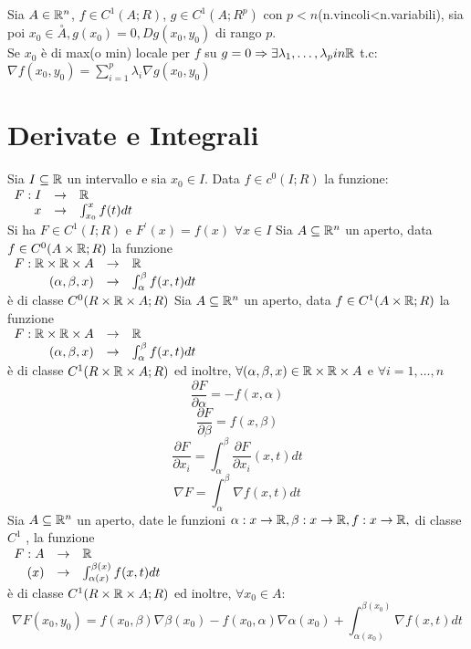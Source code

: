 Sia $A\in \mathbb{R}^n$, $f\in C^1(A;R)$, $g\in C^1(A;R^p)$ con $p<n$(n.vincoli<n.variabili), sia poi $x_0\in\overset{\circ}{A}, g(x_0)=0, Dg (x_0,y_0)$ di rango $p$.\\
Se $x_0$ è di max(o min) locale per $f$ su $g=0\Rightarrow\exists \lambda_1,\ldots,\lambda_p in \mathbb{R}$ t.c: $\nabla f(x_0,y_0) = \sum\limits_{i=1}^{p}\lambda_i\nabla g(x_0,y_0)$\\
\section{Derivate e Integrali}
Sia $I\subseteq \mathbb{R}$ un intervallo e sia $x_0\in I$. Data $f\in c^0(I;R)$ la funzione:\\
$\begin{array}{rcl} F: I & \to & \mathbb{R} \\ x & \to & \int_{x_0}^{x}f(t)dt \end{array}$\\
Si ha $F\in C^1(I;R)$ e $F^{'}(x)=f(x)$ $\forall x \in I$
\proposition
Sia $A\subseteq \mathbb{R}^n$ un aperto, data $f\in C^0(A\times \mathbb{R};R)$ la funzione \\
$\begin{array}{rcl} F: \mathbb{R}\times \mathbb{R}\times A & \to & \mathbb{R} \\ (\alpha,\beta,x) & \to & \int_{\alpha}^{\beta}f(x,t)dt \end{array}$\\
è di classe $C^0(R\times \mathbb{R}\times A;R)$
\proposition
Sia $A\subseteq \mathbb{R}^n$ un aperto, data $f\in C^1(A\times \mathbb{R};R)$ la funzione \\
$\begin{array}{rcl} F: \mathbb{R}\times \mathbb{R}\times A & \to & \mathbb{R} \\ (\alpha,\beta,x) & \to & \int_{\alpha}^{\beta}f(x,t)dt \end{array}$\\
è di classe $C^1(R\times \mathbb{R}\times A;R)$ ed inoltre, $\forall (\alpha,\beta,x)\in \mathbb{R}\times \mathbb{R}\times A$ e $\forall i=1,\ldots,n$\\
$$\frac{\partial F}{\partial \alpha}=-f(x,\alpha)$$
$$\frac{\partial F}{\partial \beta}=f(x,\beta)$$
$$\frac{\partial F}{\partial x_i}=\int_{\alpha}^{\beta}\frac{\partial F}{\partial x_i}(x,t)dt$$
$$\nabla F=\int_{\alpha}^{\beta}\nabla f(x,t)dt$$
\corollary
Sia $A\subseteq \mathbb{R}^n$ un aperto, date le funzioni $\alpha:x\rightarrow \mathbb{R}, \beta:x\rightarrow \mathbb{R}, f:x\rightarrow \mathbb{R}, $ di classe $C^1$ , la funzione \\
$\begin{array}{rcl} F: A & \to & \mathbb{R} \\ (x) & \to & \int_{\alpha(x)}^{\beta(x)}f(x,t)dt \end{array}$\\
è di classe $C^1(R\times \mathbb{R}\times A;R)$ ed inoltre, $\forall x_0 \in A$:
$$\nabla F(x_0,y_0)=f(x_0,\beta)\nabla\beta(x_0)-f(x_0,\alpha)\nabla\alpha(x_0)+\int_{\alpha(x_0)}^{\beta(x_0)}\nabla f(x,t)dt$$


